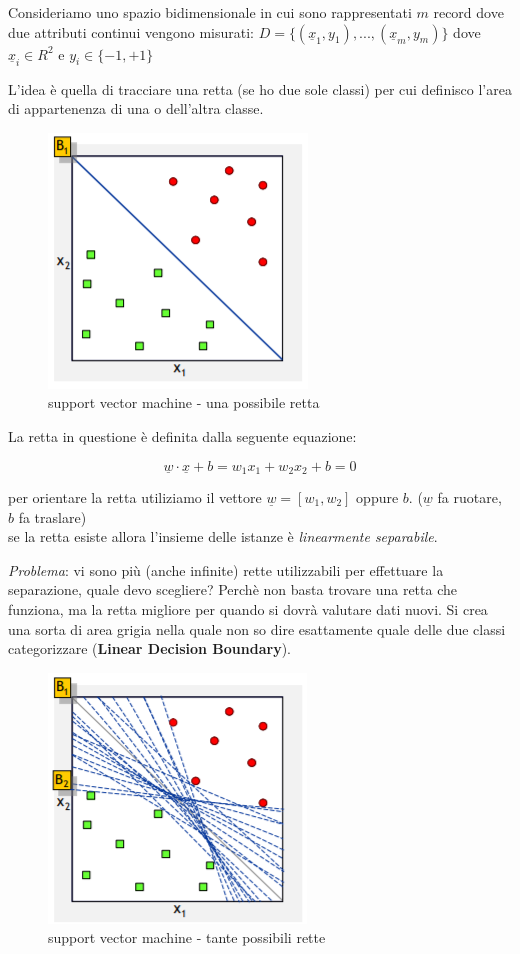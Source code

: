Consideriamo uno spazio bidimensionale in cui sono rappresentati $m$ record dove due attributi continui vengono misurati: $D = \{(\underline{x}_1, y_1),...,(\underline{x}_m, y_m)\}$ dove $\underline{x}_i \in R^2$ e $y_i \in \{-1, +1\}$

L'idea è quella di tracciare una retta (se ho due sole classi) per cui definisco l'area di appartenenza di una o dell'altra classe. 

\begin{figure}[H]
	\centering
	\includegraphics[height=0.4 \linewidth]{classification/pict/svm.png}
	\caption{support vector machine - una possibile retta}
\end{figure}

La retta in questione è definita dalla seguente equazione:

\[\underline{w} \cdot \underline{x} + b = w_1 x_1 + w_2 x_2 + b = 0\]

per orientare la retta utiliziamo il vettore $\underline{w} = [w_1,w_2]$ oppure $b$. ($\underline{w}$ fa ruotare, $b$ fa traslare)\\
se la retta esiste allora l'insieme delle istanze è \textit{linearmente separabile}.

\textit{Problema}: vi sono pi\`u (anche infinite) rette utilizzabili per effettuare la separazione, quale devo scegliere? Perch\`e non basta trovare una retta che funziona, ma la retta migliore per quando si dovr\`a valutare dati nuovi. Si crea una sorta di area grigia nella quale non so dire esattamente quale delle due classi categorizzare (\textbf{Linear Decision Boundary}).

\begin{figure}[H]
	\centering
	\includegraphics[height=0.4 \linewidth]{classification/pict/svm_rette.png}
	\caption{support vector machine - tante possibili rette}
\end{figure}

